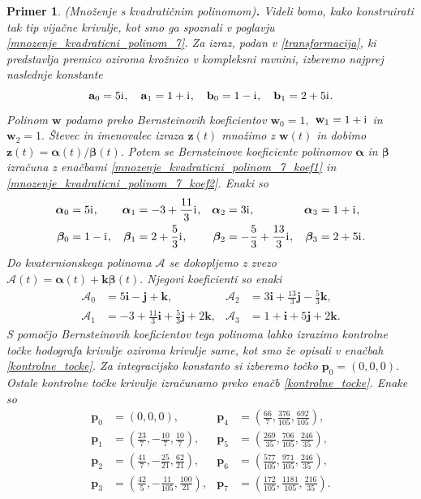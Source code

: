 \documentclass[12pt,a4paper,twoside]{article}
\newcommand{\iu}{\mathrm{i}\mkern1mu} %
\theoremstyle{definition} %
\theoremstyle{plain} %
\theoremstyle{primerstyle}
\newtheorem{primer}[definicija]{Primer}
\numberwithin{equation}{section}  %
\newcommand{\aV}{\mathbf{a}}
\newcommand{\bV}{\mathbf{b}}
\newcommand{\pV}{\mathbf{p}}
\newcommand{\iV}{\mathbf{i}}
\newcommand{\jV}{\mathbf{j}}
\newcommand{\kV}{\mathbf{k}}
\newcommand{\wV}{\mathbf{w}}
\newcommand{\zV}{\mathbf{z}}
\newcommand{\AQ}{\mathcal{A}}
\newcommand{\balpha}{\boldsymbol \alpha}
\newcommand{\bbeta}{\boldsymbol \beta}
\begin{document}
\begin{primer}
	\label{primer2}
	\textnormal{ }(Množenje s kvadratičnim polinomom)\textbf{.}
	Videli bomo, kako konstruirati tak tip vijačne krivulje, kot smo ga spoznali v poglavju \ref{mnozenje_kvadraticni_polinom_7}. Za izraz, podan v \eqref{transformacija}, ki predstavlja premico oziroma krožnico v kompleksni ravnini, izberemo najprej naslednje konstante
	\begin{equation*}
		\aV_0=5\iu,\quad\aV_1=1+\iu,\quad\bV_0=1-\iu,\quad\bV_1=2+5\iu.
	\end{equation*}
	Polinom $\wV$ podamo preko Bernsteinovih koeficientov $\wV_0=1,$ $\wV_1=1+\iu$ in $\wV_2=1.$ Števec in imenovalec izraza $\zV(t)$ množimo z $\wV(t)$ in dobimo $\zV(t)=\balpha(t)/\bbeta(t).$ Potem se Bernsteinove koeficiente polinomov $\balpha$ in $\bbeta$ izračuna z enačbami \eqref{mnozenje_kvadraticni_polinom_7_koef1} in \eqref{mnozenje_kvadraticni_polinom_7_koef2}. Enaki so
	\begin{align*}
		\balpha_0&=5\iu,&\balpha_1&=-3+\frac{11}{3}\iu,&\balpha_2&=3\iu,&\balpha_3&=1+\iu,\\
		\bbeta_0&=1-\iu,&\bbeta_1&=2+\frac{5}{3}\iu,&\bbeta_2&=-\frac{5}{3}+\frac{13}{3}\iu,&\bbeta_3&=2+5\iu.
	\end{align*}
	Do kvaternionskega polinoma $\AQ$ se dokopljemo z zvezo $\AQ(t)=\balpha(t)+\kV\bbeta(t).$ Njegovi koeficienti so enaki
	\begin{align*}
		\AQ_0&=5\iV-\jV+\kV,&\AQ_2&=3\iV+\frac{13}{3}\jV-\frac{5}{3}\kV,\\
		\AQ_1&=-3+\frac{11}{3}\iV+\frac{5}{3}\jV+2\kV,&\AQ_3&=1+\iV+5\jV+2\kV.
	\end{align*}
	S pomočjo Bernsteinovih koeficientov tega polinoma lahko izrazimo kontrolne točke hodografa krivulje oziroma krivulje same, kot smo že opisali v enačbah \eqref{kontrolne_tocke}.
	Za integracijsko konstanto si izberemo točko $\pV_0=(0,0,0).$ Ostale kontrolne točke krivulje izračunamo preko enačb \eqref{kontrolne_tocke}. Enake so
	\begin{align*}
		\pV_0&=(0,0,0),&\pV_4&=\left(\frac{66}{7},\frac{376}{105},\frac{692}{105}\right)\!,\\
		\pV_1&=\left(\frac{23}{7},-\frac{10}{7},\frac{10}{7}\right)\!,&\pV_5&=\left(\frac{269}{35},\frac{706}{105},\frac{246}{35}\right)\!,\\
		\pV_2&=\left(\frac{41}{7},-\frac{25}{21},\frac{62}{21}\right)\!,&\pV_6&=\left(\frac{577}{105},\frac{971}{105},\frac{246}{35}\right)\!,\\
		\pV_3&=\left(\frac{42}{5},-\frac{11}{105},\frac{100}{21}\right)\!,&\pV_7&=\left(\frac{172}{105},\frac{1181}{105},\frac{216}{35}\right)\!.

\end{align*}
\end{primer}
\end{document}
